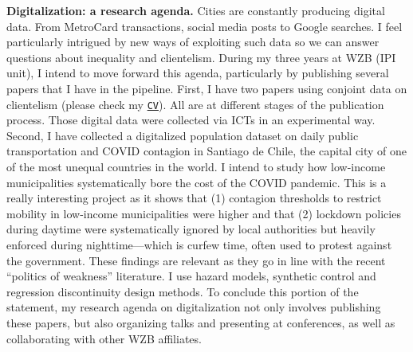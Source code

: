 {\bf Digitalization: a research agenda.} Cities are constantly producing digital data. From MetroCard transactions, social media posts to Google searches. I feel particularly intrigued by new ways of exploiting such data so we can answer questions about inequality and clientelism. During my three years at WZB (IPI unit), I intend to move forward this agenda, particularly by publishing several papers that I have in the pipeline. First, I have two papers using conjoint data on clientelism (please check my \href{http://github.com/hbahamonde/Job_Market/raw/master/Bahamonde_CV.pdf}{\texttt{CV}}). All are at different stages of the publication process. Those digital data were collected via ICTs in an experimental way. Second, I have collected a digitalized population dataset on daily public transportation and COVID contagion in Santiago de Chile, the capital city of one of the most unequal countries in the world. I intend to study how low-income municipalities systematically bore the cost of the COVID pandemic. This is a really interesting project as it shows that (1) contagion thresholds to restrict mobility in low-income municipalities were higher and that (2) lockdown policies during daytime were systematically ignored by local authorities but heavily enforced during nighttime---which is curfew time, often used to protest against the government. These findings are relevant as they go in line with the recent ``politics of weakness'' literature. I use hazard models, synthetic control and regression discontinuity design methods. To conclude this portion of the statement, my research agenda on digitalization not only involves publishing these papers, but also organizing talks and presenting at conferences, as well as collaborating with other WZB affiliates.
